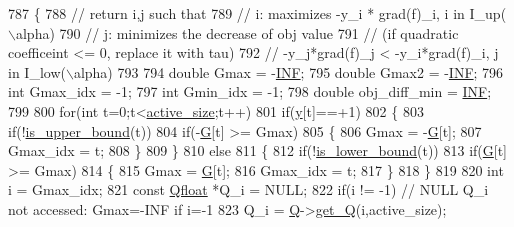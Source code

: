 \begin{DoxyCode}
787 \{
788     \textcolor{comment}{// return i,j such that}
789     \textcolor{comment}{// i: maximizes -y\_i * grad(f)\_i, i in I\_up(\(\backslash\)alpha)}
790     \textcolor{comment}{// j: minimizes the decrease of obj value}
791     \textcolor{comment}{//    (if quadratic coefficeint <= 0, replace it with tau)}
792     \textcolor{comment}{//    -y\_j*grad(f)\_j < -y\_i*grad(f)\_i, j in I\_low(\(\backslash\)alpha)}
793     
794     \textcolor{keywordtype}{double} Gmax = -\hyperlink{svm_8cpp_a12c2040f25d8e3a7b9e1c2024c618cb6}{INF};
795     \textcolor{keywordtype}{double} Gmax2 = -\hyperlink{svm_8cpp_a12c2040f25d8e3a7b9e1c2024c618cb6}{INF};
796     \textcolor{keywordtype}{int} Gmax\_idx = -1;
797     \textcolor{keywordtype}{int} Gmin\_idx = -1;
798     \textcolor{keywordtype}{double} obj\_diff\_min = \hyperlink{svm_8cpp_a12c2040f25d8e3a7b9e1c2024c618cb6}{INF};
799 
800     \textcolor{keywordflow}{for}(\textcolor{keywordtype}{int} t=0;t<\hyperlink{class_solver_a06ba1b87b3749cc545e573151b7beca0}{active\_size};t++)
801         \textcolor{keywordflow}{if}(\hyperlink{class_solver_a3acc1043d06dedf87f054ff3eea5c426}{y}[t]==+1)   
802         \{
803             \textcolor{keywordflow}{if}(!\hyperlink{class_solver_a98d878b13d6f710fcaa0b16e657a37b6}{is\_upper\_bound}(t))
804                 \textcolor{keywordflow}{if}(-\hyperlink{class_solver_ad8ab27068f2e045591970aae1201afe9}{G}[t] >= Gmax)
805                 \{
806                     Gmax = -\hyperlink{class_solver_ad8ab27068f2e045591970aae1201afe9}{G}[t];
807                     Gmax\_idx = t;
808                 \}
809         \}
810         \textcolor{keywordflow}{else}
811         \{
812             \textcolor{keywordflow}{if}(!\hyperlink{class_solver_a5876eedb0a6de6954f6037af0992cbed}{is\_lower\_bound}(t))
813                 \textcolor{keywordflow}{if}(\hyperlink{class_solver_ad8ab27068f2e045591970aae1201afe9}{G}[t] >= Gmax)
814                 \{
815                     Gmax = \hyperlink{class_solver_ad8ab27068f2e045591970aae1201afe9}{G}[t];
816                     Gmax\_idx = t;
817                 \}
818         \}
819 
820     \textcolor{keywordtype}{int} i = Gmax\_idx;
821     \textcolor{keyword}{const} \hyperlink{svm_8cpp_a8755d90a54ecfb8d15051af3e0542592}{Qfloat} *Q\_i = NULL;
822     \textcolor{keywordflow}{if}(i != -1) \textcolor{comment}{// NULL Q\_i not accessed: Gmax=-INF if i=-1}
823         Q\_i = \hyperlink{class_solver_a2d3461718f0570bdc47f5dfb31d61e0a}{Q}->\hyperlink{class_q_matrix_a87c11086390c81293d2978e042be3d10}{get\_Q}(i,active\_size);

\end{DoxyCode}

